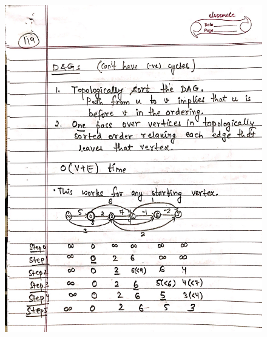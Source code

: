 \begin{figure}[H]
    \centering
    \includegraphics[scale=0.25]{"./MIT 6.006/MIT_6006_119"}
\end{figure}
\newpage
